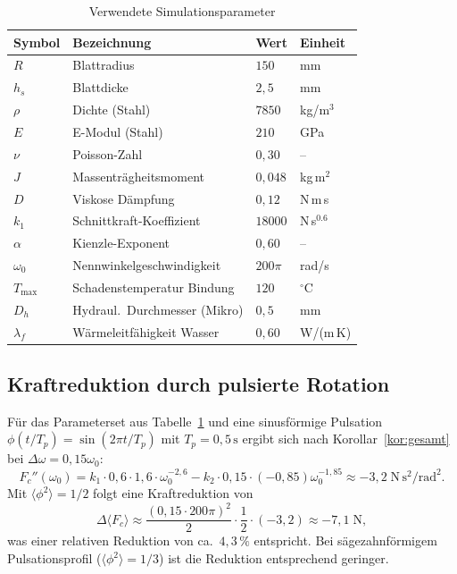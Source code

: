 ﻿\documentclass[a4paper,12pt]{article}
\theoremstyle{definition}
\begin{document}
\begin{table}[H]
\centering
\caption{Verwendete Simulationsparameter}
\label{tab:parameter}
\begin{tabular}{llll}
\toprule
\textbf{Symbol} & \textbf{Bezeichnung} & \textbf{Wert} & \textbf{Einheit} \\
\midrule
$R$        & Blattradius                   & $150$         & mm       \\
$h_s$      & Blattdicke                    & $2{,}5$       & mm       \\
$\rho$     & Dichte (Stahl)                & $7850$        & kg/m$^3$ \\
$E$        & E-Modul (Stahl)               & $210$         & GPa      \\
$\nu$      & Poisson-Zahl                  & $0{,}30$      & --       \\
$J$        & Massenträgheitsmoment         & $0{,}048$     & kg\,m$^2$ \\
$D$        & Viskose Dämpfung              & $0{,}12$      & N\,m\,s  \\
$k_1$      & Schnittkraft-Koeffizient      & $18000$       & N\,s$^{0.6}$ \\
$\alpha$   & Kienzle-Exponent              & $0{,}60$      & --       \\
$\omega_0$ & Nennwinkelgeschwindigkeit     & $200\pi$      & rad/s    \\
$T_{\max}$ & Schadenstemperatur Bindung    & $120$         & $^\circ$C \\
$D_h$      & Hydraul.\ Durchmesser (Mikro) & $0{,}5$       & mm       \\
$\lambda_f$& Wärmeleitfähigkeit Wasser     & $0{,}60$      & W/(m\,K) \\
\bottomrule
\end{tabular}
\end{table}

\subsection{Kraftreduktion durch pulsierte Rotation}

Für das Parameterset aus Tabelle~\ref{tab:parameter} und eine sinusförmige Pulsation
$\phi(t/T_p) = \sin(2\pi t/T_p)$ mit $T_p = 0{,}5\,\mathrm{s}$ ergibt sich nach
Korollar~\ref{kor:gesamt} bei $\Delta\omega = 0{,}15\omega_0$:
\[
F_c''(\omega_0) = k_1\cdot 0{,}6\cdot 1{,}6 \cdot \omega_0^{-2{,}6} - k_2\cdot 0{,}15\cdot(-0{,}85)\omega_0^{-1{,}85} \approx -3{,}2\;\mathrm{N\,s^2/rad^2}.
\]
Mit $\langle\phi^2\rangle = 1/2$ folgt eine Kraftreduktion von
\[
\Delta\langle F_c \rangle \approx \frac{(0{,}15\cdot 200\pi)^2}{2}\cdot\frac{1}{2}\cdot(-3{,}2) \approx -7{,}1\;\mathrm{N},
\]
was einer relativen Reduktion von ca.\ $4{,}3\,\%$ entspricht. Bei sägezahnförmigem
Pulsationsprofil ($\langle\phi^2\rangle = 1/3$) ist die Reduktion entsprechend geringer.
\end{document}
